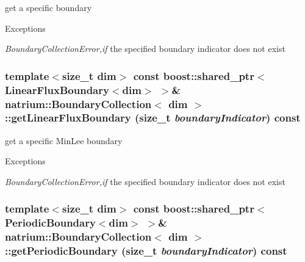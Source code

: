get a specific boundary 
\begin{DoxyExceptions}{Exceptions}
\item[{\em BoundaryCollectionError,if}]the specified boundary indicator does not exist \end{DoxyExceptions}
\hypertarget{classnatrium_1_1BoundaryCollection_a7961dc115c0a8cd29fa5cf6f553aa78f}{
\subsubsection[{getLinearFluxBoundary}]{\setlength{\rightskip}{0pt plus 5cm}template$<$size\_\-t dim$>$ const boost::shared\_\-ptr$<${\bf LinearFluxBoundary}$<$dim$>$ $>$\& {\bf natrium::BoundaryCollection}$<$ dim $>$::getLinearFluxBoundary (size\_\-t {\em boundaryIndicator}) const}}
\label{classnatrium_1_1BoundaryCollection_a7961dc115c0a8cd29fa5cf6f553aa78f}


get a specific MinLee boundary 
\begin{DoxyExceptions}{Exceptions}
\item[{\em BoundaryCollectionError,if}]the specified boundary indicator does not exist \end{DoxyExceptions}
\hypertarget{classnatrium_1_1BoundaryCollection_aea0ba68a319b3ec0f3774ba814e18217}{
\subsubsection[{getPeriodicBoundary}]{\setlength{\rightskip}{0pt plus 5cm}template$<$size\_\-t dim$>$ const boost::shared\_\-ptr$<${\bf PeriodicBoundary}$<$dim$>$ $>$\& {\bf natrium::BoundaryCollection}$<$ dim $>$::getPeriodicBoundary (size\_\-t {\em boundaryIndicator}) const}}
\label{classnatrium_1_1BoundaryCollection_aea0ba68a319b3ec0f3774ba814e18217}


